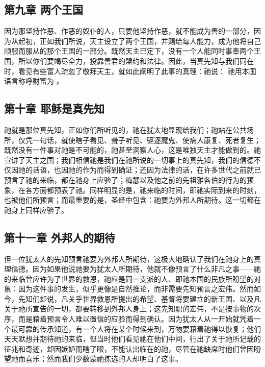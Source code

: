 
\subsection{第九章 两个王国}

因为那坚持作恶、作恶的奴仆的人，只要他坚持作恶，就不能成为善的一部分，因为从起初，正如我们所说，天主设立了两个王国，并赐给每人能力，成为他将自己顺服而服从的那个王国的一部分。既然天主已定下，没有一个人能同时事奉两个王国，所以你们要竭尽全力，投靠善君的盟约和法律。因此，当真先知与我们同在时，看见有些富人疏忽了敬拜天主，就如此阐明了此事的真理：祂说： 祂用本国语言称呼财富为 。\par


\subsection{第十章 耶稣是真先知}

祂就是那位真先知，正如你们所听见的，祂在犹太地显现给我们；祂站在公共场所，仅凭一句话，就使瞎子看见、聋子听见、驱逐魔鬼、使病人康复、死者复生；既然没有一件事对祂是不可能的，祂甚至洞察人心，这是唯独天主才能做到的。祂宣讲了天主之国；我们相信祂是我们在祂所说的一切事上的真先知，我们的信德不仅因祂的话语，也因祂的作为而得到确证；还因为法律的话，在许多世代之前就已预言了祂的来临，都在祂身上应验了；梅瑟以及他之前的先祖雅各伯的行为的预象，在各方面都预表了祂。同样明显的是，祂来临的时间，即祂实际到来的时刻，也被他们所预言；而最重要的是，圣经中包含：祂要为外邦人所期待。这一切都在祂身上同样应验了。\par


\subsection{第十一章 外邦人的期待}

但一位犹太人的先知预言祂要为外邦人所期待，这极大地确认了我们在祂身上的真理信德。因为如果他说祂要为犹太人所期待，他就不像预言了什么非凡之事——祂的来临曾应许为了世界的救恩，祂应是同一支派的人、即祂本国的民族所盼望的对象：因为这件事的发生，似乎更像是自然推论，而非需要先知预言之宏伟。然而如今，先知们却说，凡关乎世界救恩所提出的希望、基督将要建立的新王国、以及凡关于祂所宣告的一切，都要转移到外邦人身上；这先知职的宏伟，不是按事物的次序，而是藉着预言令人难以置信的应验而得到确认。因为犹太人从一开始就凭着一个最可靠的传承知道，有一个人将在某个时候来到，万物要藉着祂得以恢复；他们天天默想并期待祂的来临，但当时他们看见祂在他们中间，行出了关于祂所记载的征兆和奇迹，却因嫉妒而瞎了眼，不能认出临在的祂，尽管在祂缺席时他们曾因盼望祂而喜乐；然而我们少数蒙祂拣选的人却明白了这事。\par


